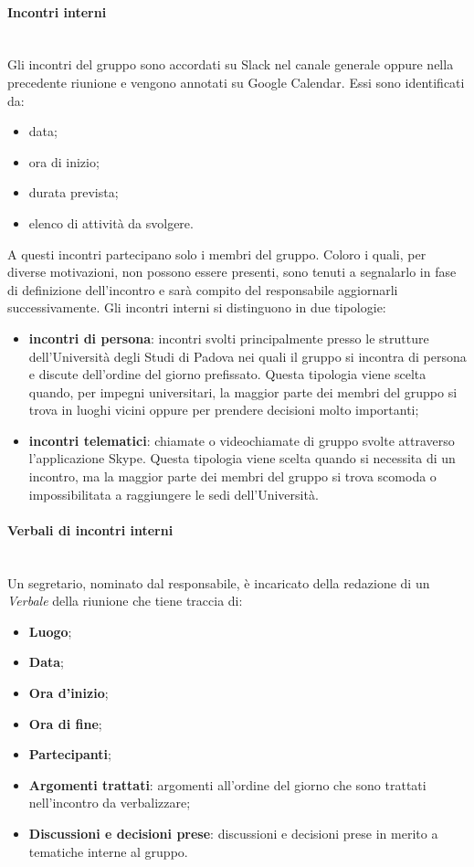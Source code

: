 			\paragraph*{Incontri interni}\mbox{}\\ [1mm]
				Gli incontri del gruppo sono accordati su Slack nel canale generale oppure nella precedente riunione e vengono annotati su Google Calendar. Essi sono identificati da:
				\begin{itemize}
					\item data;
					\item ora di inizio;
					\item durata prevista;
					\item elenco di attività da svolgere.
				\end{itemize}
				A questi incontri partecipano solo i membri del gruppo. Coloro i quali, per diverse motivazioni, non possono essere presenti, sono tenuti a segnalarlo in fase di definizione dell'incontro e sarà compito del responsabile aggiornarli successivamente.
				Gli incontri interni si distinguono in due tipologie:
				\begin{itemize}
					\item \textbf{incontri di persona}: incontri svolti principalmente presso le strutture dell'Università degli Studi di Padova nei quali il gruppo si incontra di persona e discute dell'ordine del giorno prefissato. Questa tipologia viene scelta quando, per impegni universitari, la maggior parte dei membri del gruppo si trova in luoghi vicini oppure per prendere decisioni molto importanti;
					\item \textbf{incontri telematici}: chiamate o videochiamate di gruppo svolte attraverso l'applicazione Skype. Questa tipologia viene scelta quando si necessita di un incontro, ma la maggior parte dei membri del gruppo si trova scomoda o impossibilitata a raggiungere le sedi dell'Università. 
				\end{itemize}
			\paragraph*{Verbali di incontri interni}\mbox{}\\ [1mm]
				Un segretario, nominato dal responsabile, è incaricato della redazione di un \textit{Verbale} della riunione che tiene traccia di:
				\begin{itemize}
					\item \textbf{Luogo};
					\item \textbf{Data};
					\item \textbf{Ora d'inizio};
					\item \textbf{Ora di fine};
					\item \textbf{Partecipanti};
					\item \textbf{Argomenti trattati}: argomenti all'ordine del giorno che sono trattati nell'incontro da verbalizzare;
					\item \textbf{Discussioni e decisioni prese}: discussioni e decisioni prese in merito a tematiche interne al gruppo.
				\end{itemize}
